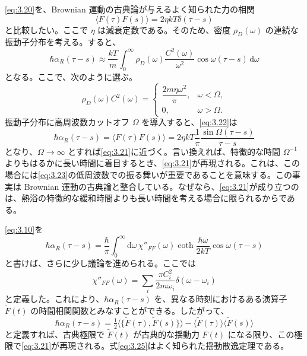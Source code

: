 \eqref{eq:3.20}を、Brownian 運動の古典論が与えるよく知られた力の相関\cite{ref01}
\begin{equation}
\langle F(\tau)F(s)\rangle=2\eta kT\delta(\tau-s)
\tag{3.21}\label{eq:3.21}
\end{equation}
と比較したい。ここで $\eta$ は減衰定数である。そのため、密度 $\rho_D(\omega)$ の連続な振動子分布を考える。すると、
\begin{equation}
\hbar\alpha_R(\tau-s)\approx\frac{kT}{m}
\int_0^\infty\rho_D(\omega)\frac{C^2(\omega)}{\omega^2}
\cos\omega(\tau-s)\,\mathrm d\omega
\tag{3.22}\label{eq:3.22}
\end{equation}
となる。ここで、次のように選ぶ\cite{ref20}。
\begin{equation}
\rho_D(\omega)C^2(\omega)=
\begin{cases}
\dfrac{2m\eta\omega^2}{\pi},&\omega<\Omega,\\[0.5em]
0,&\omega>\Omega.
\end{cases}
\tag{3.23}\label{eq:3.23}
\end{equation}
振動子分布に高周波数カットオフ $\Omega$ を導入すると、\eqref{eq:3.22}は
\begin{equation}
\hbar\alpha_R(\tau-s)=\langle F(\tau)F(s)\rangle
=2\eta kT\frac{1}{\pi}\frac{\sin\Omega(\tau-s)}{\tau-s}
\tag{3.24}\label{eq:3.24}
\end{equation}
となり、$\Omega\to\infty$ とすれば\eqref{eq:3.21}に近づく。言い換えれば、特徴的な時間 $\Omega^{-1}$ よりもはるかに長い時間に着目するとき、\eqref{eq:3.21}が再現される。これは、この場合には\eqref{eq:3.23}の低周波数での振る舞いが重要であることを意味する。この事実は Brownian 運動の古典論と整合している。なぜなら、\eqref{eq:3.21}が成り立つのは、熱浴の特徴的な緩和時間よりも長い時間を考える場合に限られるからである。

\eqref{eq:3.10}を
\begin{equation}
\hbar\alpha_R(\tau-s)=\frac{\hbar}{\pi}\int_0^\infty
\mathrm d\omega\,\chi''_{FF}(\omega)
\coth\frac{\hbar\omega}{2kT}\cos\omega(\tau-s)
\tag{3.25}\label{eq:3.25}
\end{equation}
と書けば、さらに少し議論を進められる。ここでは
\begin{equation}
\chi''_{FF}(\omega)=\sum_i\frac{\pi C_i^2}{2m\omega_i}
\delta(\omega-\omega_i)
\tag{3.26}\label{eq:3.26}
\end{equation}
と定義した。これにより、$\hbar\alpha_R(\tau-s)$ を、異なる時刻におけるある演算子 $\widetilde F(t)$ の時間相関関数とみなすことができる。したがって、
\begin{equation}
\hbar\alpha_R(\tau-s)=
\tfrac12\langle\{\widetilde F(\tau),\widetilde F(s)\}\rangle
-\langle\widetilde F(\tau)\rangle\langle\widetilde F(s)\rangle
\tag{3.27}\label{eq:3.27}
\end{equation}
と定義すれば、古典極限で $\widetilde F(t)$ が古典的な揺動力 $F(t)$ になる限り、この極限で\eqref{eq:3.21}が再現される。式\eqref{eq:3.25}はよく知られた揺動散逸定理である\cite{ref24}。

